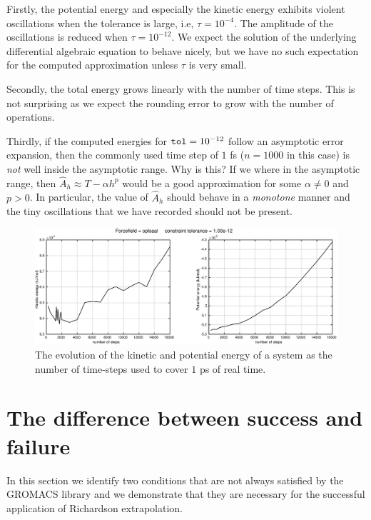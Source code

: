 \documentclass[runningheads]{llncs}
\begin{document}
Firstly, the potential energy and especially the kinetic energy exhibits violent oscillations when the tolerance is large, i.e, $\tau = 10^{-4}$. The amplitude of the oscillations is reduced when $\tau = 10^{-12}$. We expect the solution of the underlying differential algebraic equation to behave nicely, but we have no such expectation for the computed approximation unless $\tau$ is very small. 

Secondly, the total energy grows linearly with the number of time steps. This is not surprising as we expect the rounding error to grow with the number of operations.

Thirdly, if the computed energies for ${\tt tol} = 10 ^{-12}$ follow an asymptotic error expansion, then the commonly used time step of $1$ fs ($n=1000$ in this case) is \emph{not} well inside the asymptotic range. Why is this? If we where in the asymptotic range, then $\hat{A}_h \approx T - \alpha h^p$ would be a good approximation for some $\alpha \not = 0$ and $p>0$. In particular, the value of $\hat{A}_h$ should behave in a \emph{monotone} manner and the tiny oscillations that we have recorded should not be present.

\begin{figure}
  \centering
  \includegraphics[width=\linewidth]{oplsaaltol12.pdf}
   \caption{The evolution of the kinetic and potential energy of a system as the number of time-steps used to cover $1$ ps of real time.} \label{fig:oplsaaltol12}
\end{figure}


\section{The difference between success and failure}

In this section we identify two conditions that are not always satisfied by the GROMACS library and we demonstrate that they are necessary for the successful application of Richardson extrapolation.
\end{document}
